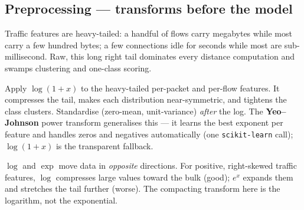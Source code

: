 \documentclass[11pt,a4paper]{article}
\begin{document}
\subsection{Preprocessing --- transforms before the model}
Traffic features are heavy-tailed: a handful of flows carry megabytes while most carry a few hundred bytes; a few connections idle for seconds while most are sub-millisecond. Raw, this long right tail dominates every distance computation and swamps clustering and one-class scoring.

\begin{tcolorbox}[idea]
Apply $\log(1+x)$ to the heavy-tailed per-packet and per-flow features. It compresses the tail, makes each distribution near-symmetric, and tightens the class clusters. Standardise (zero-mean, unit-variance) \emph{after} the log. The \textbf{Yeo--Johnson} power transform generalises this --- it learns the best exponent per feature and handles zeros and negatives automatically (one \texttt{scikit-learn} call); $\log(1+x)$ is the transparent fallback.
\end{tcolorbox}

\begin{tcolorbox}[warnbox]
$\log$ and $\exp$ move data in \emph{opposite} directions. For positive, right-skewed traffic features, $\log$ compresses large values toward the bulk (good); $e^{x}$ expands them and stretches the tail further (worse). The compacting transform here is the logarithm, not the exponential.
\end{tcolorbox}
\end{document}
